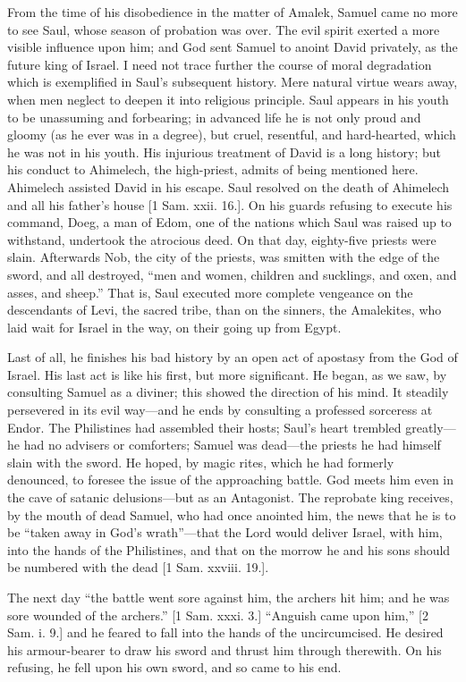 From the time of his disobedience in the matter of Amalek, Samuel
came no more to see Saul, whose season of probation was over. The evil
spirit exerted a more visible influence upon him; and God sent Samuel
to anoint David privately, as the future king of Israel. I need not
trace further the course of moral degradation which is exemplified in
Saul's subsequent history. Mere natural virtue wears away, when men
neglect to deepen it into religious principle. Saul appears in his
youth to be unassuming and forbearing; in advanced life he is not only
proud and gloomy (as he ever was in a degree), but cruel, resentful,
and hard-hearted, which he was not in his youth. His injurious
treatment of David is a long history; but his conduct to Ahimelech,
the high-priest, admits of being mentioned here. Ahimelech assisted
David in his escape. Saul resolved on the death of Ahimelech and all
his father's house [1 Sam. xxii. 16.]. On his guards refusing to
execute his command, Doeg, a man of Edom, one of the nations which
Saul was raised up to withstand, undertook the atrocious deed. On that
day, eighty-five priests were slain. Afterwards Nob, the city of the
priests, was smitten with the edge of the sword, and all destroyed,
``men and women, children and sucklings, and oxen, and asses, and
sheep.'' That is, Saul executed more complete vengeance on the
descendants of Levi, the sacred tribe, than on the sinners, the
Amalekites, who laid wait for Israel in the way, on their going up
from Egypt.

Last of all, he finishes his bad history by an open act of apostasy
from the God of Israel. His last act is like his first, but more
significant. He began, as we saw, by consulting Samuel as a diviner;
this showed the direction of his mind. It steadily persevered in its
evil way—and he ends by consulting a professed sorceress at Endor.
The Philistines had assembled their hosts; Saul's heart trembled
greatly—he had no advisers or comforters; Samuel was dead—the
priests he had himself slain with the sword. He hoped, by magic rites,
which he had formerly denounced, to foresee the issue of the
approaching battle. God meets him even in the cave of satanic
delusions—but as an Antagonist. The reprobate king receives, by the
mouth of dead Samuel, who had once anointed him, the news that he is
to be ``taken away in God's wrath''—that the Lord would
deliver Israel, with him, into the hands of the Philistines, and that
on the morrow he and his sons should be numbered with the dead [1 Sam.
xxviii. 19.].

The next day ``the battle went sore against him, the archers
hit him; and he was sore wounded of the archers.'' [1 Sam. xxxi.
3.] ``Anguish came upon him,'' [2 Sam. i. 9.] and he feared to
fall into the hands of the uncircumcised. He desired his armour-bearer
to draw his sword and thrust him through therewith. On his refusing,
he fell upon his own sword, and so came to his end.

